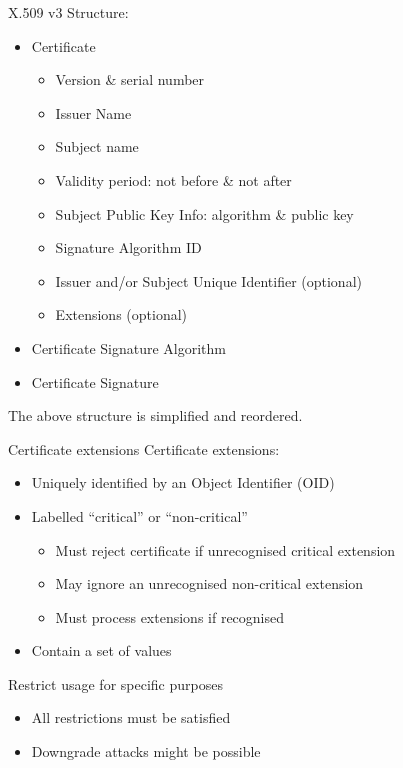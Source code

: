 \begin{frame}{X.509 v3}
  Structure:
  \begin{itemize}[<+(1)->]
    \item Certificate
    \begin{itemize}
      \item Version \& serial number
      \item Issuer Name
      \item Subject name
      \item Validity period: not before \& not after
      \item Subject Public Key Info: algorithm \& public key
      \item Signature Algorithm ID
      \item Issuer and/or Subject Unique Identifier (optional)
      \item Extensions (optional)
    \end{itemize}
    \item Certificate Signature Algorithm
    \item Certificate Signature
  \end{itemize}

  \pause
  The above structure is simplified and reordered.
\end{frame}

\begin{frame}{Certificate extensions}
  Certificate extensions:
  \begin{itemize}[<+(1)->]
    \item Uniquely identified by an Object Identifier (OID)
    \item Labelled \enquote{critical} or \enquote{non-critical}
    \begin{itemize}
      \item Must reject certificate if unrecognised critical extension
      \item May ignore an unrecognised non-critical extension
      \item Must process extensions if recognised
    \end{itemize}
    \item Contain a set of values
  \end{itemize}

  \pause
  Restrict usage for specific purposes
  \begin{itemize}[<+(1)->]
    \item All restrictions must be satisfied
    \item Downgrade attacks might be possible
  \end{itemize}
\end{frame}


